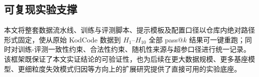 \subsection{可复现实验支撑}
本文将整套数据流水线、训练与评测脚本、提示模板及配置口径以仓库内绝对路径形式固定，使从原始 KodCode 数据到 $H_1$--$H_{10}$ 全部 pass@$k$ 结果可一键重跑；同时对训练-评测一致性约束、合法性约束、随机性来源与超参口径进行统一记录。该框架既保证了本文实证结论的可验证性，也为后续在更大数据规模、更多基座模型、更细粒度失效模式归因等方向上的扩展研究提供了直接可用的实验底座。